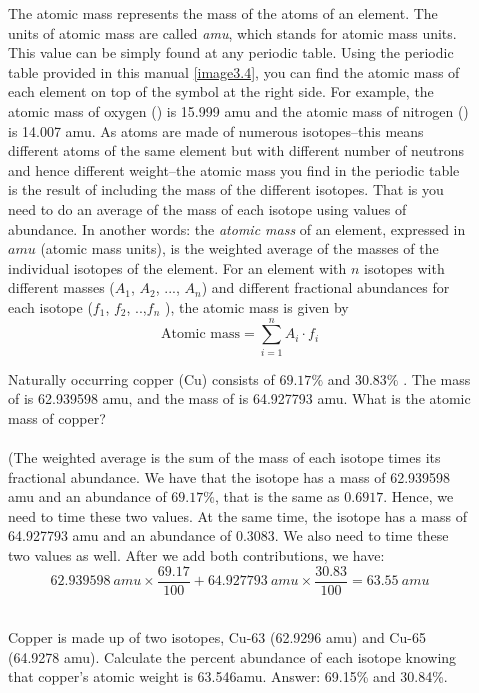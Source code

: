 \documentclass[main.tex]{subfiles}
\begin{document}
\begin{description}
\item[] 
The atomic mass represents the mass of the atoms of an element. The units of atomic mass are called \emph{amu}, which stands for atomic mass units. This value can be simply found at any periodic table. Using the periodic table provided in this manual \ref{image3.4}, you can find the atomic mass of each element on top of the symbol at the right side. For example, the atomic mass of oxygen () is 15.999 amu and the atomic mass of nitrogen () is 14.007 amu. As atoms are made of numerous isotopes--this means different atoms of the same element but with different number of neutrons and hence different weight--the atomic mass you find in the periodic table is the result of including the mass of the different isotopes. That is you need to do an average of the mass of each isotope using values of abundance. In another words: the \textit{atomic mass} of an element, expressed in $amu$ (atomic mass units), is the weighted average of the masses of the individual isotopes of the element. For an element with $n$ isotopes with different masses ($A_1$, $A_2$, ..., $A_n$) and different fractional abundances for each isotope ($f_1$, $f_2$, ..,$f_n$ ), the atomic mass is given by
\[\text{Atomic mass}=\sum_{i=1}^{n} A_i\cdot f_i\]
\begin{example} %
Naturally occurring copper (Cu) consists of $69.17\%$  and $30.83\%$ . The mass of  is 62.939598 amu, and the mass of  is 64.927793 amu. What is the atomic mass of copper?\\
\\
(The weighted average is the sum of the mass of each isotope times its fractional abundance. We have that the isotope  has a mass of 62.939598 amu and an abundance of $69.17\%$, that is the same as $0.6917$. Hence, we need to time these two values. At the same time, the isotope   has a mass of 64.927793 amu and an abundance of $0.3083$. We also need to time these two values as well. After we add both contributions, we have:
\[ 62.939598\:amu\times\frac{69.17}{100}   +
64.927793\:amu\times\frac{30.83 }{100} = 63.55\:amu\]

\faDiamond\ \\
Copper is made up of two isotopes, Cu-63 (62.9296 amu) and Cu-65 (64.9278 amu). Calculate the percent abundance of each isotope knowing that copper's atomic weight is 63.546amu.
\flushright Answer: 69.15\% and 30.84\%. 
\end{example}%
\end{description}
\end{document}
